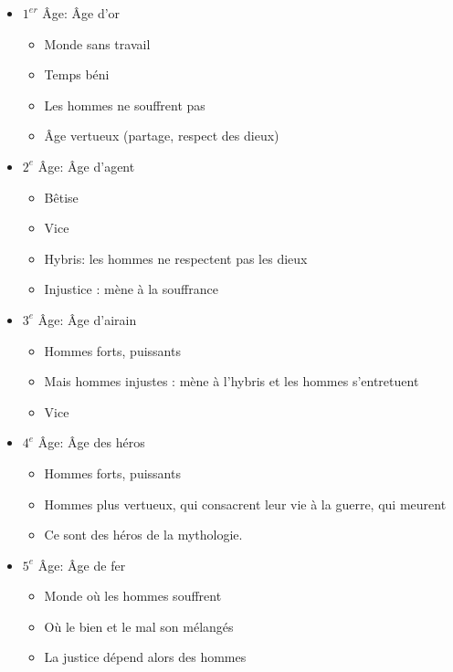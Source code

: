 \documentclass[a4paper, 11pt, hidelinks]{article}
\begin{document}
\begin{itemize}
    \item $1^{er}$ Âge: Âge d'or
    \begin{itemize}
        \item Monde sans travail
        \item Temps béni
        \item Les hommes ne souffrent pas
        \item Âge vertueux (partage, respect des dieux)
    \end{itemize}
    \item $2^e$ Âge: Âge d'agent   
    \begin{itemize}
        \item Bêtise
        \item Vice 
        \item Hybris: les hommes ne respectent pas les dieux
        \item Injustice : mène à la souffrance
    \end{itemize}
    \item $3^e$ Âge: Âge d'airain
    \begin{itemize}
        \item Hommes forts, puissants
        \item Mais hommes injustes : mène à l'hybris et les hommes s'entretuent
        \item Vice 
    \end{itemize}
    \item $4^e$ Âge: Âge des héros
    \begin{itemize}
        \item Hommes forts, puissants
        \item Hommes plus vertueux, qui consacrent leur vie à la guerre, qui meurent
        \item Ce sont des héros de la mythologie.
    \end{itemize}
    \item $5^e$ Âge: Âge de fer
    \begin{itemize}
        \item Monde où les hommes souffrent
        \item Où le bien et le mal son mélangés
        \item La justice dépend alors des hommes
    \end{itemize}
\end{itemize}




\end{document}
